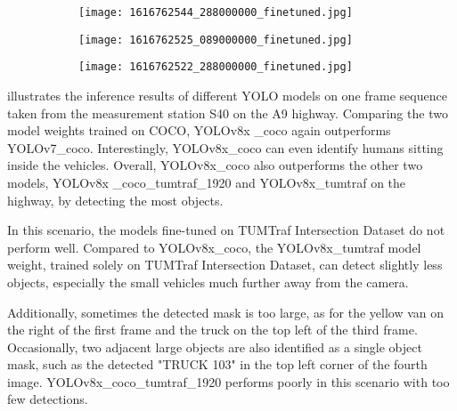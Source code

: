 \begin{table}[htb]
	\begin{subfigure}{\textwidth}
		\centering
		\begin{subfigure}{0.32\textwidth}
			\texttt{[image: 1616762544\_288000000\_finetuned.jpg]}
		\end{subfigure}\hfill
		\begin{subfigure}{0.32\textwidth}
			\texttt{[image: 1616762525\_089000000\_finetuned.jpg]}
		\end{subfigure}\hfill
		\begin{subfigure}{0.32\textwidth}
			\texttt{[image: 1616762522\_288000000\_finetuned.jpg]}
		\end{subfigure}
	\end{subfigure}
	\label{figure:ablation_study_highway}
	\vspace{1em} 
\end{table}

 illustrates the inference results of different YOLO models on one frame sequence taken from the measurement station S40 on the A9 highway. Comparing the two model weights trained on COCO, YOLOv8x \_coco again outperforms YOLOv7\_coco. Interestingly, YOLOv8x\_coco can even identify humans sitting inside the vehicles. Overall, YOLOv8x\_coco also outperforms the other two models, YOLOv8x \_coco\_tumtraf\_1920 and YOLOv8x\_tumtraf on the highway, by detecting the most objects. 

In this scenario, the models fine-tuned on TUMTraf Intersection Dataset do not perform well. Compared to YOLOv8x\_coco, the YOLOv8x\_tumtraf model weight, trained solely on TUMTraf Intersection Dataset, can detect slightly less objects, especially the small vehicles much further away from the camera. 

Additionally, sometimes the detected mask is too large, as for the yellow van on the right of the first frame and the truck on the top left of the third frame. Occasionally, two adjacent large objects are also identified as a single object mask, such as the detected "TRUCK 103" in the top left corner of the fourth image. YOLOv8x\_coco\_tumtraf\_1920 performs poorly in this scenario with too few detections. 

